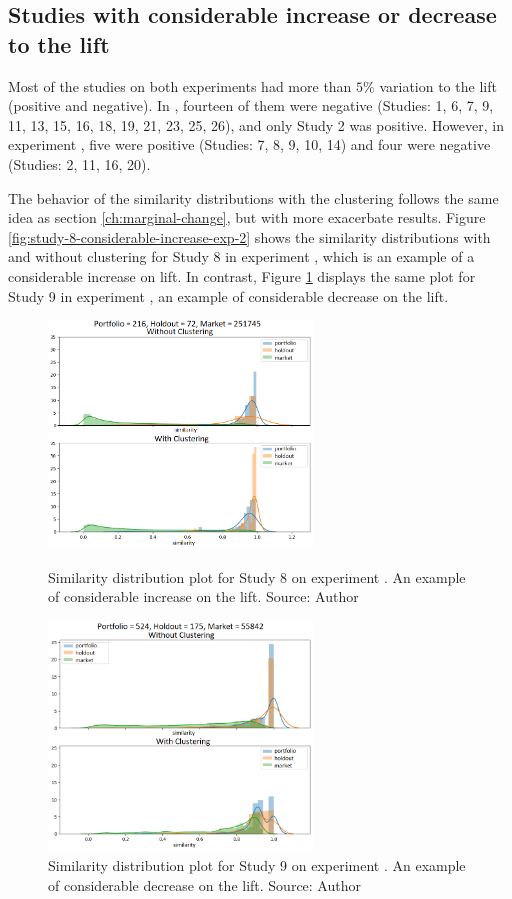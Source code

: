 \subsection{Studies with considerable increase or decrease to the lift}
\label{ch:considerable-change}

Most of the studies on both experiments had more than $5\%$ variation to the lift (positive and negative). In \nameExperimentI{}, fourteen of them were negative (Studies: 1, 6, 7, 9, 11, 13, 15, 16, 18, 19, 21, 23, 25, 26), and only Study 2 was positive. However, in experiment \nameExperimentII{}, five were positive (Studies: 7, 8, 9, 10, 14) and four were negative (Studies: 2, 11, 16, 20).

The behavior of the similarity distributions with the clustering follows the same idea as section \ref{ch:marginal-change}, but with more exacerbate results. Figure \ref{fig:study-8-considerable-increase-exp-2} shows the similarity distributions with and without clustering for Study 8 in experiment \nameExperimentII{}, which is an example of a considerable increase on lift. In contrast, Figure \ref{fig:study-9-considerable-decrease-exp-1} displays the same plot for Study 9 in experiment \nameExperimentI{}, an example of considerable decrease on the lift.

\begin{figure}[h]
   \centering
   \includegraphics[width=7cm]{fig/ch4-study-8-considerable-increase-exp-2.png}
   \caption{Similarity distribution plot for Study 8 on experiment \nameExperimentII{}. An example of considerable increase on the lift. Source: Author}
   \label{fig:study-8-considerable-increase-exp-2}

   \includegraphics[width=7cm]{fig/ch4-study-9-considerable-decrease-exp-1.png}
   \caption{Similarity distribution plot for Study 9 on experiment \nameExperimentI{}. An example of considerable decrease on the lift. Source: Author}
   \label{fig:study-9-considerable-decrease-exp-1}
\end{figure}

